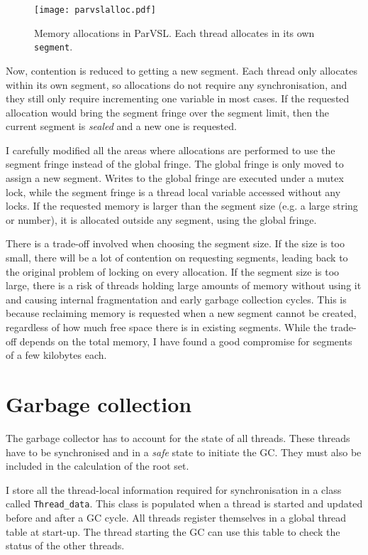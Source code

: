 \begin{figure}[H]
  \centering
  \texttt{[image: parvslalloc.pdf]}
  \caption[Memory allocations in ParVSL]{Memory allocations in ParVSL. Each thread allocates in its own \texttt{segment}.}
  \label{fig:parvslalloc}
\end{figure}

Now, contention is reduced to getting a new segment. Each thread only allocates within
its own segment, so allocations do not require any synchronisation, and they still only
require incrementing one variable in most cases. If the requested allocation would bring
the segment fringe over the segment limit, then the current segment is \emph{sealed} and a new one is
requested.

I carefully modified all the areas where allocations are performed to use the segment fringe
instead of the global fringe. The global fringe is only moved to assign a new segment. Writes
to the global fringe are executed under a mutex lock, while the segment fringe is a thread local
variable accessed without any locks. If the requested memory is larger than the segment size
(e.g. a large string or number), it is allocated outside any segment, using the global fringe.

There is a trade-off involved when choosing the segment size. If the size is too small,
there will be a lot of contention on requesting segments, leading back to the original
problem of locking on every allocation. If the segment size is too large, there is a risk
of threads holding large amounts of memory without using it and causing internal fragmentation and
early garbage collection cycles. This is because reclaiming memory is requested when a new segment cannot be created,
regardless of how much free space there is in existing segments. While the trade-off depends on the
total memory, I have found a good compromise for segments of a few kilobytes each.

\section{Garbage collection}
\label{sec:gc}
The garbage collector has to account for the state of all threads. These threads have to be synchronised
and in a \emph{safe} state to initiate the GC. They must also be included in the calculation of the root set.

I store all the thread-local information required for synchronisation in a class called \verb|Thread_data|. This
class is populated when a thread is started and updated before and after a GC cycle. All threads register
themselves in a global thread table at start-up. The thread starting the GC can use this table to check the status
of the other threads.

